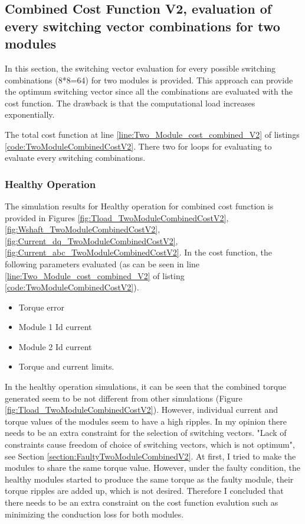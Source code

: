\documentclass{article}
\begin{document}
\subsection{Combined Cost Function V2, evaluation of every switching vector combinations for two modules}
In this section, the switching vector evaluation for every possible switching combinations (8*8=64) for two modules is provided. This approach can provide the optimum switching vector since all the combinations are evaluated with the cost function. The drawback is that the computational load increases exponentially. 

The total cost function at line \ref{line:Two_Module_cost_combined_V2} of listings \ref{code:TwoModuleCombinedCostV2}. There two for loops for evaluating to evaluate every switching combinations.

\subsubsection{Healthy Operation}
\label{section:HealthyTwoModuleCombinedV2}
The simulation results for Healthy operation for combined cost function is provided in Figures \ref{fig:Tload_TwoModuleCombinedCostV2}, \ref{fig:Wshaft_TwoModuleCombinedCostV2}, \ref{fig:Current_dq_TwoModuleCombinedCostV2}, \ref{fig:Current_abc_TwoModuleCombinedCostV2}. In the cost function, the following parameters evaluated (as can be seen in line \ref{line:Two_Module_cost_combined_V2} of listing \ref{code:TwoModuleCombinedCostV2}).
\begin{itemize}
    \item Torque error
    \item Module 1 Id current
    \item Module 2 Id current
    \item Torque and current limits.
\end{itemize}
In the healthy operation simulations, it can be seen that the combined torque generated seem to be not different from other simulations (Figure \ref{fig:Tload_TwoModuleCombinedCostV2}). However, individual current and torque values of the modules seem to have a high ripples. In my opinion there needs to be an extra constraint for the selection of switching vectors. "Lack of constraints cause freedom of choice of switching vectors, which is not optimum", see Section \ref{section:FaultyTwoModuleCombinedV2}.
At first, I tried to make the modules to share the same torque value. However, under the faulty condition, the healthy modules started to produce the same torque as the faulty module, their torque ripples are added up, which is not desired. Therefore I concluded that there needs to be an extra constraint on the cost function evalution such as minimizing the conduction loss for both modules. 
\end{document}
